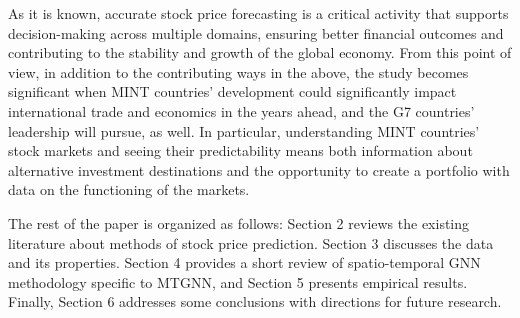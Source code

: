 As it is known, accurate stock price forecasting is a critical activity that supports decision-making across multiple domains, ensuring better financial outcomes and contributing to the stability and growth of the global economy. From this point of view, in addition to the contributing ways in the above, the study becomes significant when MINT countries' development could significantly impact international trade and economics in the years ahead, and the G7 countries' leadership will pursue, as well. In particular, understanding MINT countries' stock markets and seeing their predictability means both information about alternative investment destinations and the opportunity to create a portfolio with data on the functioning of the markets.

The rest of the paper is organized as follows: Section 2 reviews the existing literature about methods of stock price prediction. Section 3 discusses the data and its properties. Section 4 provides a short review of spatio-temporal GNN methodology specific to MTGNN, and Section 5 presents empirical results. Finally, Section 6 addresses some conclusions with directions for future research.
